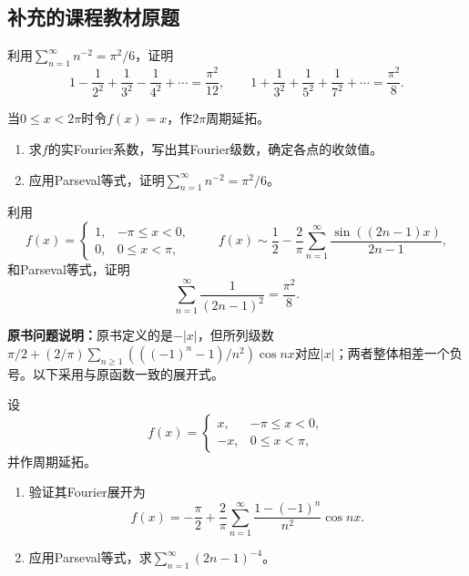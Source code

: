 \subsection*{补充的课程教材原题}

利用$\sum_{n=1}^{\infty}n^{-2}=\pi^2/6$，证明
\[
 1-\frac1{2^2}+\frac1{3^2}-\frac1{4^2}+\cdots=\frac{\pi^2}{12},
 \qquad
 1+\frac1{3^2}+\frac1{5^2}+\frac1{7^2}+\cdots=\frac{\pi^2}{8}.
\]

当$0\le x<2\pi$时令$f(x)=x$，作$2\pi$周期延拓。
\begin{enumerate}[label=(\arabic*)]
\item 求$f$的实Fourier系数，写出其Fourier级数，确定各点的收敛值。
\item 应用Parseval等式，证明$\sum_{n=1}^{\infty}n^{-2}=\pi^2/6$。
\end{enumerate}

利用
\[
 f(x)=\begin{cases}1,&-\pi\le x<0,\\0,&0\le x<\pi,\end{cases}
 \qquad
 f(x)\sim\frac12-\frac2\pi\sum_{n=1}^{\infty}
                    \frac{\sin((2n-1)x)}{2n-1},
\]
和Parseval等式，证明
\[
 \sum_{n=1}^{\infty}\frac1{(2n-1)^2}=\frac{\pi^2}{8}.
\]

\noindent\textbf{原书问题说明：}原书定义的是$-\lvert x\rvert$，但所列级数
$\pi/2+(2/\pi)\sum_{n\ge1}(((-1)^n-1)/n^2)\cos nx$对应$\lvert x\rvert$；两者整体相差一个负号。以下采用与原函数一致的展开式。

设
\[
 f(x)=\begin{cases}x,&-\pi\le x<0,\\-x,&0\le x<\pi,\end{cases}
\]
并作周期延拓。
\begin{enumerate}[label=(\arabic*)]
\item 验证其Fourier展开为
\[
 f(x)=-\frac\pi2+\frac2\pi\sum_{n=1}^{\infty}
                   \frac{1-(-1)^n}{n^2}\cos nx.
\]
\item 应用Parseval等式，求$\sum_{n=1}^{\infty}(2n-1)^{-4}$。
\end{enumerate}

